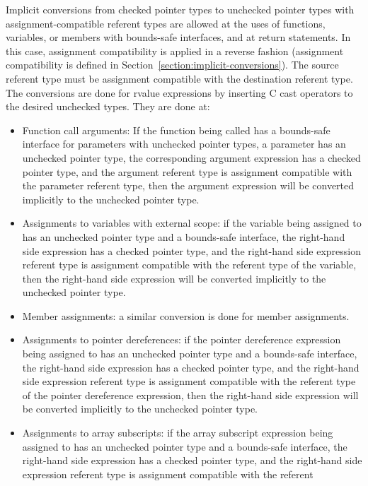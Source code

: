 Implicit conversions from checked pointer types to unchecked pointer types
with assignment-compatible referent types are allowed at the uses of functions,
variables, or members with bounds-safe interfaces, and at return statements.  
In this case, assignment compatibility is applied in a reverse fashion (assignment compatibility
is defined in Section~\ref{section:implicit-conversions}).
The source referent type must be
assignment compatible with the destination referent type.  The conversions are
done for rvalue expressions by inserting C cast operators to the desired unchecked types.
They are done at:
\begin{itemize}
\item Function call arguments: If the function being called has a
      bounds-safe interface for parameters with unchecked pointer types, a parameter
      has an unchecked pointer type, the corresponding argument expression
      has a checked pointer type, and the argument referent type is assignment
      compatible with the parameter referent type, then the argument expression
      will be converted implicitly to the unchecked pointer type.
\item Assignments to variables with external scope: if the variable being
     assigned to has an unchecked pointer type and a bounds-safe interface, the
     right-hand side expression has a checked pointer type, and the right-hand
     side expression referent type is assignment compatible with the referent
     type of the variable, then the right-hand side expression will be converted
     implicitly to the unchecked pointer type.
\item
    Member assignments: a similar conversion is done for member assignments.
\item Assignments to pointer dereferences: if the pointer dereference expression
  being assigned to has an unchecked pointer type and a bounds-safe interface, the
  right-hand side expression has a checked pointer type, and the right-hand side
  expression referent type is assignment compatible with the referent type of the
  pointer dereference expression, then the right-hand side expression will be
  converted implicitly to the unchecked pointer type.
\item Assignments to array subscripts: if the array subscript expression being
  assigned to has an unchecked pointer type and a bounds-safe interface, the
  right-hand side expression has a checked pointer type, and the right-hand
  side expression referent type is assignment compatible with the referent

\end{itemize}
